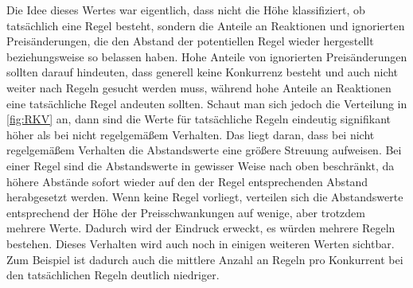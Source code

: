 Die Idee dieses Wertes war eigentlich, dass nicht die Höhe klassifiziert, ob tatsächlich eine Regel besteht, sondern die Anteile an Reaktionen und ignorierten Preisänderungen, die den Abstand der potentiellen Regel wieder hergestellt beziehungsweise so belassen haben. Hohe Anteile von ignorierten Preisänderungen sollten darauf hindeuten, dass generell keine Konkurrenz besteht und auch nicht weiter nach Regeln gesucht werden muss, während hohe Anteile an Reaktionen eine tatsächliche Regel andeuten sollten. 
Schaut man sich jedoch die Verteilung in \autoref{fig:RKV} an, dann sind die Werte für tatsächliche Regeln eindeutig signifikant höher als bei nicht regelgemäßem Verhalten. Das liegt daran, dass bei nicht regelgemäßem Verhalten die Abstandswerte eine größere Streuung aufweisen. Bei einer Regel sind die Abstandswerte in gewisser Weise nach oben beschränkt, da höhere Abstände sofort wieder auf den der Regel entsprechenden Abstand herabgesetzt werden. Wenn keine Regel vorliegt, verteilen sich die Abstandswerte entsprechend der Höhe der Preisschwankungen auf wenige, aber trotzdem mehrere Werte. Dadurch wird der Eindruck erweckt, es würden mehrere Regeln bestehen. Dieses Verhalten wird auch noch in einigen weiteren Werten sichtbar. Zum Beispiel ist dadurch auch die mittlere Anzahl an Regeln pro Konkurrent bei den tatsächlichen Regeln deutlich niedriger.\\

